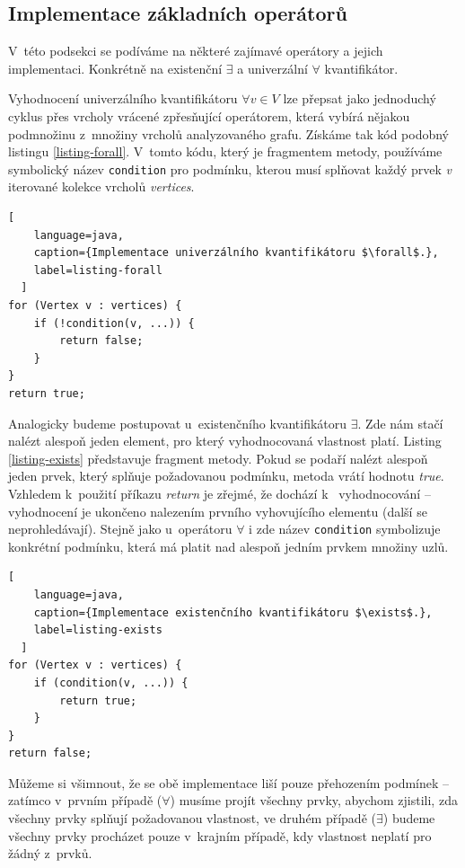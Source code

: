 \subsection{Implementace základních operátorů}
V~této podsekci se podíváme na některé zajímavé operátory a jejich implementaci. Konkrétně na existenční $\exists$ a univerzální $\forall$ kvantifikátor.

Vyhodnocení univerzálního kvantifikátoru $\forall v \in V$ lze přepsat jako jednoduchý cyklus přes vrcholy vrácené zpřesňující operátorem, která vybírá nějakou podmnožinu z~množiny vrcholů analyzovaného grafu. Získáme tak kód podobný listingu \ref{listing-forall}. V~tomto kódu, který je fragmentem metody, používáme symbolický název \verb+condition+ pro podmínku, kterou musí splňovat každý prvek \emph{v} iterované kolekce vrcholů \emph{vertices}.
\vspace{0.5cm}
\begin{lstlisting}[
    language=java,
    caption={Implementace univerzálního kvantifikátoru $\forall$.},
    label=listing-forall
  ]
for (Vertex v : vertices) {
    if (!condition(v, ...)) {
        return false;
    }
}
return true;
\end{lstlisting}

Analogicky budeme postupovat u~existenčního kvantifikátoru $\exists$. Zde nám stačí nalézt alespoň jeden element, pro který vyhodnocovaná vlastnost platí. Listing \ref{listing-exists} představuje fragment metody. Pokud se podaří nalézt alespoň jeden prvek, který splňuje požadovanou podmínku, metoda vrátí hodnotu \emph{true}. Vzhledem k~použití příkazu \emph{return} je zřejmé, že dochází k~ vyhodnocování -- vyhodnocení je ukončeno nalezením prvního vyhovujícího elementu (další se neprohledávají). Stejně jako u~operátoru $\forall$ i zde název \verb+condition+ symbolizuje konkrétní podmínku, která má platit nad alespoň jedním prvkem množiny uzlů.

\vspace{0.5cm}
\begin{lstlisting}[
    language=java,
    caption={Implementace existenčního kvantifikátoru $\exists$.},
    label=listing-exists
  ]
for (Vertex v : vertices) {
    if (condition(v, ...)) {
        return true;
    }
}
return false;
\end{lstlisting}

Můžeme si všimnout, že se obě implementace liší pouze přehozením podmínek -- zatímco v~prvním případě ($\forall$) musíme projít všechny prvky, abychom zjistili, zda všechny prvky splňují požadovanou vlastnost, ve druhém případě ($\exists$) budeme všechny prvky procházet pouze v~krajním případě, kdy vlastnost neplatí pro žádný z~prvků.

